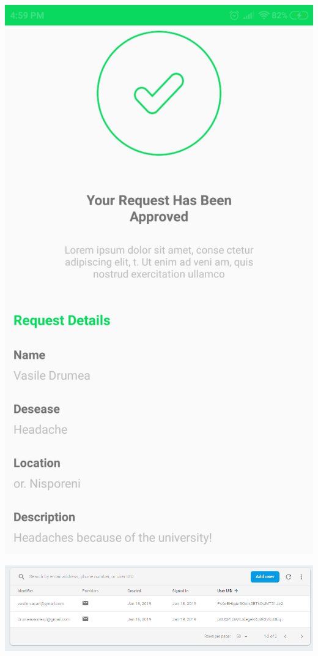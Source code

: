 \begin{center}
\includegraphics[scale=0.3]{img/Capture4.png}
\newpage

\includegraphics[scale=0.7]{img/Capture5.png}

\end{center}
\clearpage